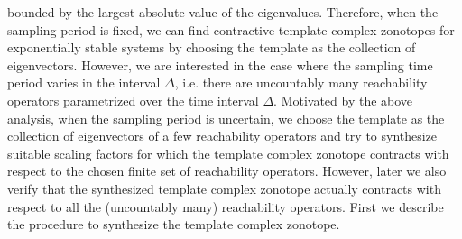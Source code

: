 bounded by the largest absolute value of the eigenvalues.  
Therefore, when the sampling period is fixed, we can find contractive
template complex zonotopes for exponentially stable systems by
choosing the template as the collection of eigenvectors.  However, we
are interested in the case where the sampling time period varies in
the interval $\Delta$, i.e. there are uncountably many reachability
operators parametrized over the time interval $\Delta$. Motivated by
the above analysis, when the sampling period is uncertain, we choose
the template as the collection of eigenvectors of a few reachability
operators and try to synthesize suitable scaling factors for which the
template complex zonotope contracts with respect to the chosen finite
set of reachability operators.  However, later we also verify that the
synthesized template complex zonotope actually contracts with respect
to all the (uncountably many) reachability operators.  First we
describe the procedure to synthesize the template complex zonotope.

